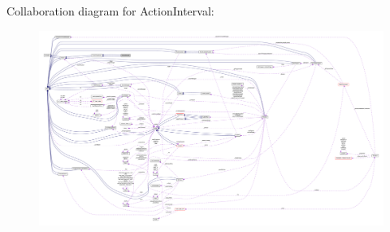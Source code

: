 Collaboration diagram for Action\+Interval\+:
\nopagebreak
\begin{figure}[H]
\begin{center}
\leavevmode
\includegraphics[width=350pt]{classActionInterval__coll__graph}
\end{center}
\end{figure}
